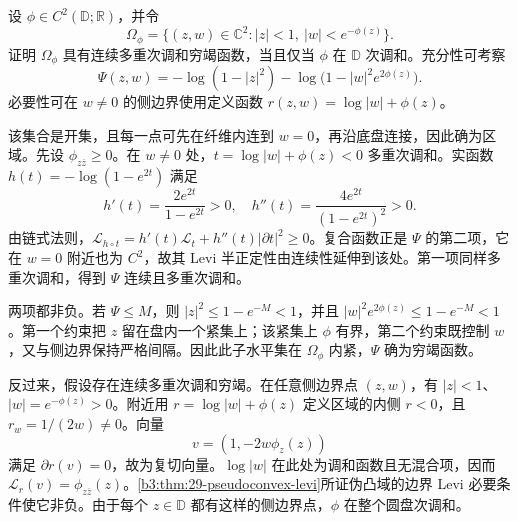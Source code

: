 \begin{optionalexercise}\label{b3:ex:29-4}
设 \(\phi\in C^2(\mathbb D;\mathbb R)\)，并令
\[
 \Omega_\phi=\{(z,w)\in\mathbb C^2:|z|<1,\ |w|<e^{-\phi(z)}\}.
\]
证明 \(\Omega_\phi\) 具有连续多重次调和穷竭函数，当且仅当 \(\phi\) 在 \(\mathbb D\) 次调和。充分性可考察
\[
 \Psi(z,w)=-\log(1-|z|^2)
           -\log\bigl(1-|w|^2e^{2\phi(z)}\bigr).
\]
必要性可在 \(w\ne0\) 的侧边界使用定义函数 \(r(z,w)=\log|w|+\phi(z)\)。
\end{optionalexercise}
\begin{solution}
该集合是开集，且每一点可先在纤维内连到 \(w=0\)，再沿底盘连接，因此确为区域。先设 \(\phi_{z\overline z}\ge0\)。在 \(w\ne0\) 处，\(t=\log|w|+\phi(z)<0\) 多重次调和。实函数
\(h(t)=-\log(1-e^{2t})\) 满足
\[
 h'(t)=\frac{2e^{2t}}{1-e^{2t}}>0,\quad
 h''(t)=\frac{4e^{2t}}{(1-e^{2t})^2}>0.
\]
由链式法则，\(\mathcal L_{h\circ t}=h'(t)\mathcal L_t+h''(t)|\partial t|^2\ge0\)。复合函数正是 \(\Psi\) 的第二项，它在 \(w=0\) 附近也为 \(C^2\)，故其 Levi 半正定性由连续性延伸到该处。第一项同样多重次调和，得到 \(\Psi\) 连续且多重次调和。

两项都非负。若 \(\Psi\le M\)，则 \(|z|^2\le1-e^{-M}<1\)，并且
\(|w|^2e^{2\phi(z)}\le1-e^{-M}<1\)。第一个约束把 \(z\) 留在盘内一个紧集上；该紧集上 \(\phi\) 有界，第二个约束既控制 \(w\)，又与侧边界保持严格间隔。因此此子水平集在 \(\Omega_\phi\) 内紧，\(\Psi\) 确为穷竭函数。

反过来，假设存在连续多重次调和穷竭。在任意侧边界点 \((z,w)\)，有 \(|z|<1\)、\(|w|=e^{-\phi(z)}>0\)。附近用 \(r=\log|w|+\phi(z)\) 定义区域的内侧 \(r<0\)，且 \(r_w=1/(2w)\ne0\)。向量
\[
 v=(1,-2w\phi_z(z))
\]
满足 \(\partial r(v)=0\)，故为复切向量。\(\log|w|\) 在此处为调和函数且无混合项，因而
\(\mathcal L_r(v)=\phi_{z\overline z}(z)\)。\cref{b3:thm:29-pseudoconvex-levi}所证伪凸域的边界 Levi 必要条件使它非负。由于每个 \(z\in\mathbb D\) 都有这样的侧边界点，\(\phi\) 在整个圆盘次调和。
\end{solution}

